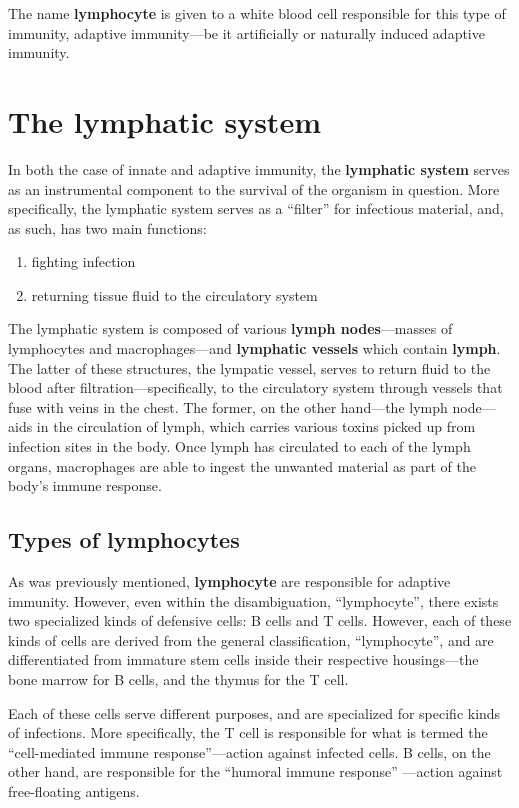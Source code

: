 \documentclass{article}
\begin{document}
The name \textbf{lymphocyte} is given to a white blood cell responsible for
this type of immunity, adaptive immunity---be it artificially or naturally
induced adaptive immunity.

\section{The lymphatic system}

In both the case of innate and adaptive immunity, the \textbf{lymphatic system}
serves as an instrumental component to the survival of the organism in
question. More specifically, the lymphatic system serves as a ``filter'' for
infectious material, and, as such, has two main functions:

\begin{enumerate}
	\item fighting infection
	\item returning tissue fluid to the circulatory system
\end{enumerate}

The lymphatic system is composed of various \textbf{lymph nodes}---masses of
lymphocytes and macrophages---and \textbf{lymphatic vessels} which contain
\textbf{lymph}. The latter of these structures, the lympatic vessel, serves
to return fluid to the blood after filtration---specifically, to the
circulatory system through vessels that fuse with veins in the chest.
The former, on the other hand---the lymph node---aids in the circulation of
lymph, which carries various toxins picked up from infection sites in the body.
Once lymph has circulated to each of the lymph organs, macrophages are able to
ingest the unwanted material as part of the body's immune response.

\subsection{Types of lymphocytes}

As was previously mentioned, \textbf{lymphocyte} are responsible for adaptive
immunity. However, even within the disambiguation, ``lymphocyte'', there
exists two specialized kinds of defensive cells: B cells and T cells.
However, each of these kinds of cells are derived from the general
classification, ``lymphocyte'', and are differentiated from immature stem cells
inside their respective housings---the bone marrow for B cells, and the thymus
for the T cell.

Each of these cells serve different purposes, and are specialized for specific
kinds of infections. More specifically, the T cell is responsible for what is
termed the ``cell-mediated immune response''---action against infected cells.
B cells, on the other hand, are responsible for the ``humoral immune response''
---action against free-floating antigens.
\end{document}

